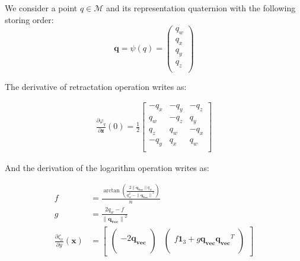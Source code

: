 We consider a point $q\in\mathcal{M}$ and its representation quaternion with the following storing order:
\begin{equation}
\mathbf{q}=\psi(q)
= \begin{pmatrix}
  q_w \\
  q_x \\
  q_y \\
  q_z \\
\end{pmatrix}
\end{equation}

The derivative of retractation operation writes as:

\begin{align}
\label{eq:diffRetrSO3Quat}
  \frac{\partial \varphi_q}{\partial \mathbf{z}}(0) = \frac{1}{2}
  \begin{bmatrix}
    -q_x & -q_y & -q_z \\
     q_w & -q_z &  q_y \\
     q_z &  q_w & -q_x \\
    -q_y &  q_x &  q_w \\
  \end{bmatrix}
\end{align}

And the derivation of the logarithm operation writes as:

\begin{align}
\label{eq:diffLogSO3Quat}
  f &= \frac{\arctan \left( \frac{2 \|\mathbf{q_{vec}}\| q_w}{q_w^2 - {\|\mathbf{q_{vec}}\|}^2} \right)}{n}\\
  g &= \frac{2 q_w - f}{{\|\mathbf{q_{vec}}\|}^2} \\
  \frac{\partial \zeta_x}{\partial y}(\mathbf{x}) &= \begin{bmatrix}
  \begin{pmatrix}
    \\
    -2\mathbf{q_{vec}}\\
    \\
  \end{pmatrix} &
  \begin{pmatrix}
    \\
    f\mathbf{1}_3 + g\mathbf{q_{vec}}\mathbf{q_{vec}}^T\\
    \\
  \end{pmatrix}
  \end{bmatrix}
\end{align}


